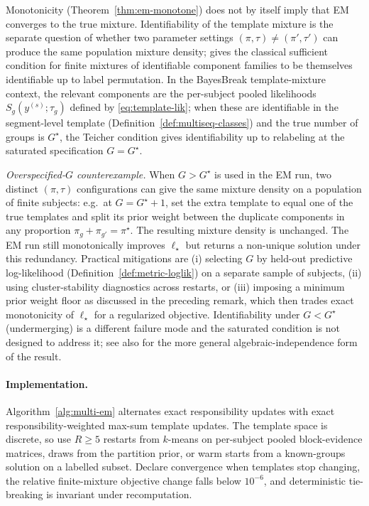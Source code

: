 \begin{remark}
\label{rem:teicher-overspec}
Monotonicity (Theorem~\ref{thm:em-monotone}) does not by itself imply that EM converges to the
true mixture. Identifiability of the template mixture is the separate question of whether two
parameter settings $(\pi,\tau)\ne (\pi',\tau')$ can produce the same population mixture density;
\citet{teicher1963identifiability} gives the classical sufficient condition for finite mixtures
of identifiable component families to be themselves identifiable up to label permutation. In the
BayesBreak template-mixture context, the relevant components are the per-subject pooled
likelihoods $S_g(y^{(s)};\tau_g)$ defined by \eqref{eq:template-lik}; when these are identifiable
in the segment-level template (Definition~\ref{def:multiseq-classes}) and the true number of
groups is $G^\star$, the Teicher condition gives identifiability up to relabeling at the
saturated specification $G=G^\star$.

\emph{Overspecified-$G$ counterexample.} When $G>G^\star$ is used in the EM run, two distinct
$(\pi,\tau)$ configurations can give the same mixture density on a population of finite subjects:
e.g.\ at $G=G^\star+1$, set the extra template to equal one of the true templates and split its
prior weight between the duplicate components in any proportion $\pi_g+\pi_{g'}=\pi^\star$. The
resulting mixture density is unchanged. The EM run still monotonically improves $\ell_\star$ but
returns a non-unique solution under this redundancy. Practical mitigations are (i) selecting $G$
by held-out predictive log-likelihood (Definition~\ref{def:metric-loglik}) on a separate sample
of subjects, (ii) using cluster-stability diagnostics across restarts, or (iii) imposing a
minimum prior weight floor as discussed in the preceding remark, which then trades exact
monotonicity of $\ell_\star$ for a regularized objective. Identifiability under $G<G^\star$
(undermerging) is a different failure mode and the saturated condition is not designed to
address it; see also \citet{teicher1963identifiability} for the more general algebraic-independence
form of the result.
\end{remark}

\paragraph{Implementation.}
Algorithm~\ref{alg:multi-em} alternates exact responsibility updates with exact
responsibility-weighted max-sum template updates. The template space is discrete, so use
$R\ge 5$ restarts from $k$-means on per-subject pooled block-evidence matrices, draws from the
partition prior, or warm starts from a known-groups solution on a labelled subset. Declare
convergence when templates stop changing, the relative finite-mixture objective change falls
below $10^{-6}$, and deterministic tie-breaking is invariant under recomputation.

